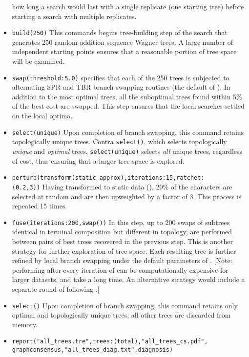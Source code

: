 \begin{itemize}
how long a search would last with a single replicate (one starting tree) before starting a search with multiple 
replicates.
\item \texttt{build(250)} This commands begins tree-building step of the search that generates 250 
random-addition sequence Wagner trees. A large number of independent starting points ensures that a 
reasonable portion of tree space will be examined.
\item \texttt{swap(threshold:5.0)}  specifies that each of the 250 trees is subjected to 
alternating SPR and TBR branch swapping routines (the default of \poy). 
In addition to the most optimal trees, all the suboptimal trees found within 5\% of the best cost are swapped.
 This step ensures that the local searches settled on the local optima.
\item \texttt{select(unique)} Upon completion of branch swapping, this command retains topologically unique trees.
Contra \texttt{select()}, which selects topologically \emph{unique} and \emph{optimal} trees,  \texttt{select(unique)} 
selects \emph{all} unique trees, regardless of cost, thus ensuring that a larger tree space is explored.
\item \texttt{perturb(transform(static\_approx),iterations:15,ratchet:\\(0.2,3))} Having transformed to static data 
(), 20\% of the characters are selected at random and are then upweighted by 
a factor of $3$.  This process is repeated 15 times.
\item \texttt{fuse(iterations:200,swap())} In this step, up to 200 swaps of subtrees identical in terminal 
composition but different in topology, are performed between pairs of best trees recovered in the previous 
step. This is another strategy for further exploration of tree space. Each resulting tree is further refined by 
local branch swapping under the default parameters of . [Note: performing 
 after every iteration of  can be computationally expensive 
for larger datasets, and take a long time. An alternative strategy would include a separate round of 
 following .] 
\item \texttt{select()} Upon completion of branch swapping, this command retains only optimal and 
topologically unique trees; all other trees are discarded from memory.
\item \texttt{report("all\_trees.tre",trees:(total),"all\_trees\_cs.pdf",\\ graphconsensus,"all\_trees\_diag.txt",diagnosis)} 

\end{itemize}
